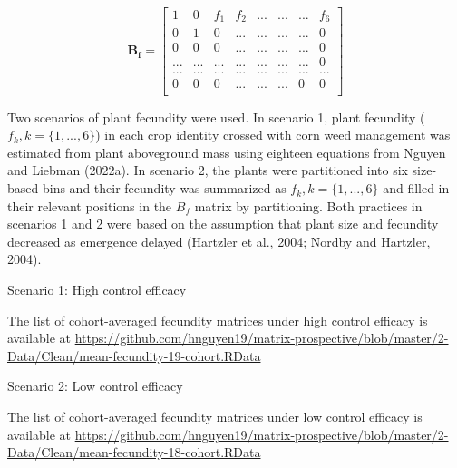 \documentclass[
]{article}
\begin{document}
\[
\mathbf{B_f} = \left[\begin{array}
{rr|rrrrr} 
1 & 0 & f_1 & f_2 & ... & ... & ... & f_6\\
0 & 1 & 0 & ... & ... & ... & ... & 0\\
\hline   
0 & 0 & 0 & ... & ... & ... & ... & 0\\
... & ...& ... & ... &...&...&...& 0\\
... & ... & ... & ... & ... & ... & ... & ...\\ 
0 & 0 & 0 & ... & ... & ... & 0 & 0\\
\end{array}\right]
\]

Two scenarios of plant fecundity were used. In scenario 1, plant fecundity (\(f_k, k =\{1,...,6\}\)) in each crop identity crossed with corn weed management was estimated from plant aboveground mass using eighteen equations from Nguyen and Liebman (2022a). In scenario 2, the plants were partitioned into six size-based bins and their fecundity was summarized as \(f_k, k =\{1,...,6\}\) and filled in their relevant positions in the \(B_f\) matrix by partitioning. Both practices in scenarios 1 and 2 were based on the assumption that plant size and fecundity decreased as emergence delayed (Hartzler et al., 2004; Nordby and Hartzler, 2004).

Scenario 1: High control efficacy

The list of cohort-averaged fecundity matrices under high control efficacy is available at \url{https://github.com/hnguyen19/matrix-prospective/blob/master/2-Data/Clean/mean-fecundity-19-cohort.RData}

Scenario 2: Low control efficacy

The list of cohort-averaged fecundity matrices under low control efficacy is available at \url{https://github.com/hnguyen19/matrix-prospective/blob/master/2-Data/Clean/mean-fecundity-18-cohort.RData}
\end{document}
